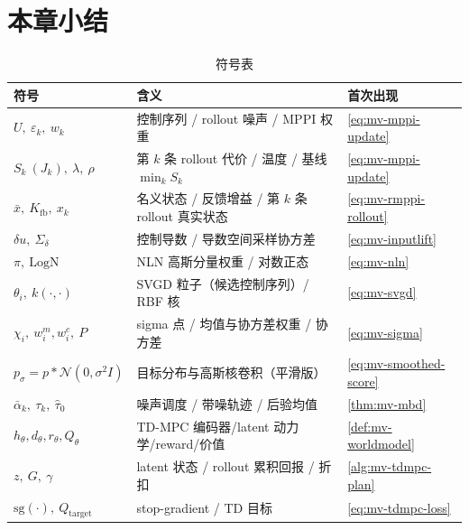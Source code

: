 \section*{本章小结}

\begin{table}[H]\centering\small
\caption{符号表}
\begin{tabular}{lll}
\toprule
符号 & 含义 & 首次出现 \\
\midrule
$U,\ \varepsilon_k,\ w_k$ & 控制序列 / rollout 噪声 / MPPI 权重 & \cref{eq:mv-mppi-update} \\
$S_k\ (J_k),\ \lambda,\ \rho$ & 第 $k$ 条 rollout 代价 / 温度 / 基线 $\min_k S_k$ & \cref{eq:mv-mppi-update} \\
$\bar x,\ K_{\text{fb}},\ x_k$ & 名义状态 / 反馈增益 / 第 $k$ 条 rollout 真实状态 & \cref{eq:mv-rmppi-rollout} \\
$\delta u,\ \Sigma_\delta$ & 控制导数 / 导数空间采样协方差 & \cref{eq:mv-inputlift} \\
$\pi,\ \mathrm{LogN}$ & NLN 高斯分量权重 / 对数正态 & \cref{eq:mv-nln} \\
$\theta_i,\ k(\cdot,\cdot)$ & SVGD 粒子（候选控制序列）/ RBF 核 & \cref{eq:mv-svgd} \\
$\chi_i,\ w_i^m,w_i^c,\ P$ & sigma 点 / 均值与协方差权重 / 协方差 & \cref{eq:mv-sigma} \\
$p_\sigma=p*\mathcal{N}(0,\sigma^2 I)$ & 目标分布与高斯核卷积（平滑版） & \cref{eq:mv-smoothed-score} \\
$\bar\alpha_k,\ \tau_k,\ \hat\tau_0$ & 噪声调度 / 带噪轨迹 / 后验均值 & \cref{thm:mv-mbd} \\
$h_\theta,d_\theta,r_\theta,Q_\theta$ & TD-MPC 编码器/latent 动力学/reward/价值 & \cref{def:mv-worldmodel} \\
$z,\ G,\ \gamma$ & latent 状态 / rollout 累积回报 / 折扣 & \cref{alg:mv-tdmpc-plan} \\
$\mathrm{sg}(\cdot),\ Q_{\text{target}}$ & stop-gradient / TD 目标 & \cref{eq:mv-tdmpc-loss} \\
\bottomrule
\end{tabular}
\end{table}

